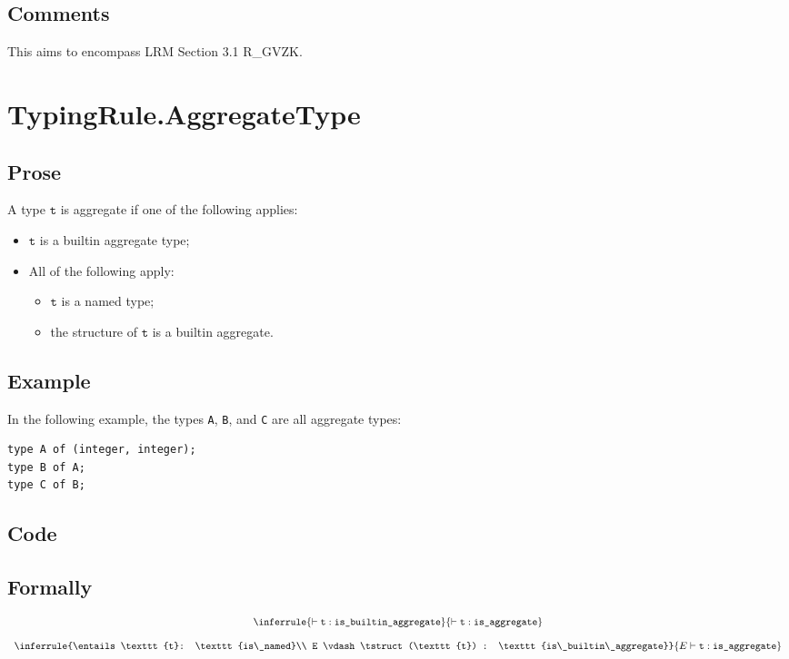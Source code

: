 \documentclass{book}
\newcommand\isbuiltinaggregate[0]{\texttt{is\_builtin\_aggregate}}
\newcommand\isnamed[0]{\texttt{is\_named}}
\newcommand\isaggregate[0]{\texttt{is\_aggregate}}
\newcommand\vt[0]{\texttt{t}}
\begin{document}
    \subsection{Comments}
    This aims to encompass LRM Section 3.1 R\_GVZK.

\section{TypingRule.AggregateType}

    \subsection{Prose}
    A type $\vt$ is aggregate if one of the following applies:
    \begin{itemize}
    \item $\vt$ is a builtin aggregate type;
    \item All of the following apply:
      \begin{itemize}
      \item $\vt$ is a named type;
      \item the structure of $\vt$ is a builtin aggregate. 
      \end{itemize}
    \end{itemize}

    \subsection{Example}
In the following example, the types \texttt{A}, \texttt{B}, and \texttt{C} are all aggregate types:
\begin{verbatim}
type A of (integer, integer);
type B of A;
type C of B;
\end{verbatim}

    \subsection{Code}

\begin{formal}
      \subsection{Formally}
      
\[
\begin{array}{c}
\inferrule{\entails \vt : \isbuiltinaggregate}{\entails \vt : \isaggregate}\\
\\
\inferrule{\entails \vt : \isnamed \\ E \vdash \tstruct(\vt) : \isbuiltinaggregate}{E \entails \vt : \isaggregate}
\end{array}
\]
\end{formal}
\end{document}
